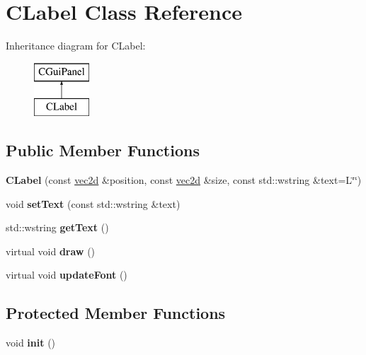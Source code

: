 \hypertarget{class_c_label}{
\section{CLabel Class Reference}
\label{class_c_label}
}
Inheritance diagram for CLabel:\begin{figure}[H]
\begin{center}
\leavevmode
\includegraphics[height=2.000000cm]{class_c_label}
\end{center}
\end{figure}
\subsection*{Public Member Functions}
\begin{DoxyCompactItemize}
\item 
\hypertarget{class_c_label_a7a9403391654ab37d5b08d83f22f7297}{
{\bfseries CLabel} (const \hyperlink{classvec2d}{vec2d} \&position, const \hyperlink{classvec2d}{vec2d} \&size, const std::wstring \&text=L\char`\"{}\char`\"{})}
\label{class_c_label_a7a9403391654ab37d5b08d83f22f7297}

\item 
\hypertarget{class_c_label_a0e0203561ca39ce5818f9fbf358b94e2}{
void {\bfseries setText} (const std::wstring \&text)}
\label{class_c_label_a0e0203561ca39ce5818f9fbf358b94e2}

\item 
\hypertarget{class_c_label_abb48935a5dfa15a83f686f7932a0e876}{
std::wstring {\bfseries getText} ()}
\label{class_c_label_abb48935a5dfa15a83f686f7932a0e876}

\item 
\hypertarget{class_c_label_aa0694ff29b8d4cc14bc45d00863bb48c}{
virtual void {\bfseries draw} ()}
\label{class_c_label_aa0694ff29b8d4cc14bc45d00863bb48c}

\item 
\hypertarget{class_c_label_a6db8b77b75a008fce6970e1b80cc29e1}{
virtual void {\bfseries updateFont} ()}
\label{class_c_label_a6db8b77b75a008fce6970e1b80cc29e1}

\end{DoxyCompactItemize}
\subsection*{Protected Member Functions}
\begin{DoxyCompactItemize}
\item 
\hypertarget{class_c_label_ac80139bb1042d7778ff2b91c9500d557}{
void {\bfseries init} ()}
\label{class_c_label_ac80139bb1042d7778ff2b91c9500d557}

\end{DoxyCompactItemize}

